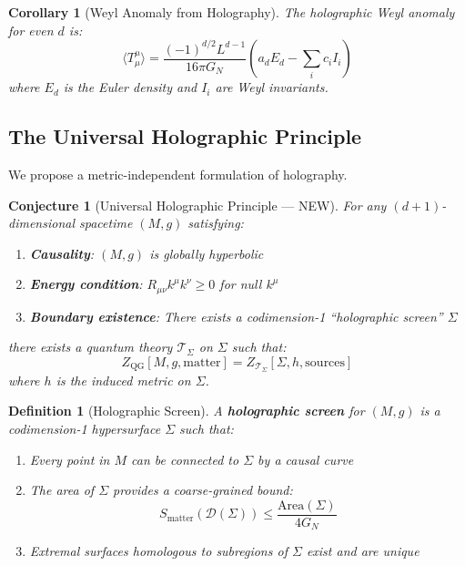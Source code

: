 \documentclass[12pt,a4paper]{article}
\newtheorem{conjecture}[theorem]{Conjecture}
\newtheorem{definition}[theorem]{Definition}
\newtheorem{corollary}[theorem]{Corollary}
\begin{document}
\begin{corollary}[Weyl Anomaly from Holography]
The holographic Weyl anomaly for even $d$ is:
\begin{equation}
\langle T^\mu_\mu \rangle = \frac{(-1)^{d/2} L^{d-1}}{16\pi G_N} \left( a_d E_d - \sum_i c_i I_i \right)
\end{equation}
where $E_d$ is the Euler density and $I_i$ are Weyl invariants.
\end{corollary}

\subsection{The Universal Holographic Principle}

We propose a metric-independent formulation of holography.

\begin{conjecture}[Universal Holographic Principle --- NEW]
For \textit{any} $(d+1)$-dimensional spacetime $(M, g)$ satisfying:
\begin{enumerate}
    \item \textbf{Causality}: $(M, g)$ is globally hyperbolic
    \item \textbf{Energy condition}: $R_{\mu\nu} k^\mu k^\nu \geq 0$ for null $k^\mu$
    \item \textbf{Boundary existence}: There exists a codimension-1 ``holographic screen'' $\Sigma$
\end{enumerate}
there exists a quantum theory $\mathcal{T}_\Sigma$ on $\Sigma$ such that:
\begin{equation}
\boxed{
Z_{\text{QG}}[M, g, \text{matter}] = Z_{\mathcal{T}_\Sigma}[\Sigma, h, \text{sources}]
}
\end{equation}
where $h$ is the induced metric on $\Sigma$.
\end{conjecture}

\begin{definition}[Holographic Screen]
A \textbf{holographic screen} for $(M, g)$ is a codimension-1 hypersurface $\Sigma$ such that:
\begin{enumerate}
    \item Every point in $M$ can be connected to $\Sigma$ by a causal curve
    \item The area of $\Sigma$ provides a coarse-grained bound:
    \begin{equation}
    S_{\text{matter}}(\mathcal{D}(\Sigma)) \leq \frac{\text{Area}(\Sigma)}{4G_N}
    \end{equation}
    \item Extremal surfaces homologous to subregions of $\Sigma$ exist and are unique
\end{enumerate}
\end{definition}
\end{document}
